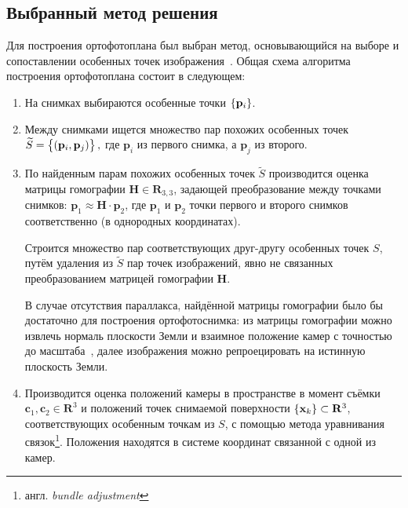 \documentclass[a4paper,12pt]{article}
\begin{document}
\subsection{Выбранный метод решения}
Для построения ортофотоплана был выбран метод, основывающийся на выборе и 
сопоставлении особенных точек изображения~\cite{cham98matchframework, brown03recognising, mclauchlan02mosaic}.
Общая схема алгоритма построения ортофотоплана состоит в следующем:
\begin{enumerate}
  \item На снимках выбираются особенные точки $\cbr{ \mathbf{p}_i }$.
  
  \item Между снимками ищется множество пар похожих особенных 
  точек $\widetilde{S} = \cbr{(\mathbf{p}_i, \mathbf{p}_j )},$
  где $\mathbf{p}_i$ из первого снимка, а $\mathbf{p}_j$ из второго.
  
  \item По найденным парам похожих особенных точек $\widetilde{S}$ производится 
  оценка матрицы гомографии $\mathbf{H} \in \mathbf{R}_{3, 3}$, 
  задающей преобразование между точками снимков: 
  $\mathbf{p}_1 \approx \mathbf{H} \cdot \mathbf{p}_2$, 
  где $\mathbf{p}_1$ и $\mathbf{p}_2$ точки первого и второго снимков 
  соответственно (в однородных координатах). 
  
  Строится множество пар соответствующих друг-другу особенных точек $S$, путём
  удаления из $\widetilde{S}$ пар точек изображений, явно не связанных
  преобразованием матрицей гомографии $\mathbf{H}$.
  
  В случае отсутствия параллакса, найдённой матрицы гомографии было бы достаточно 
  для построения ортофотоснимка: из матрицы гомографии можно извлечь нормаль 
  плоскости Земли и взаимное положение камер с точностью до масштаба~\cite{malis07homodecomp}, 
  далее изображения можно репроецировать на истинную плоскость Земли.
  
  \item Производится оценка положений камеры в пространстве в момент съёмки
  $\mathbf{c}_1, \mathbf{c}_2 \in \mathbf{R}^3$ и
  положений точек снимаемой поверхности $\cbr{ \mathbf{x}_k } \subset \mathbf{R}^3$,
  соответствующих особенным точкам из $S$, с помощью метода уравнивания
  связок\footnote{англ. \textit{bundle adjustment}}.
  Положения находятся в системе координат связанной с одной из камер.
  

\end{enumerate}
\end{document}
